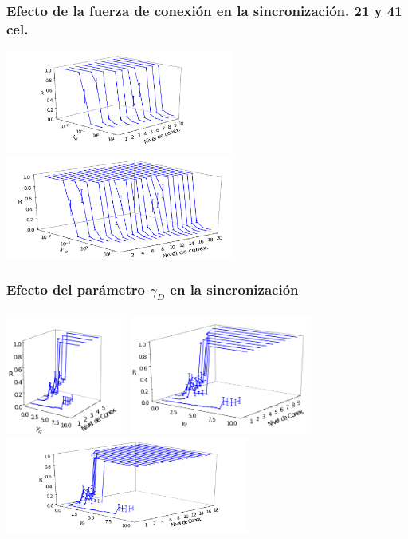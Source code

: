 \documentclass[xcolor=table, xllnames]{beamer}
\begin{document}
\begin{frame}
\frametitle{Efecto de la fuerza de conexión en la sincronización. 21 y 41 cel.}

\centering
\includegraphics[width=7.5cm]{Figuras/figuraVarkdcortadoVer3d_43.pdf} \\
\includegraphics[width=7.5cm]{Figuras/figuraVarkdcortadoVer3d_42.pdf}

\end{frame}

\begin{frame}
	\frametitle{Efecto del parámetro $\gamma_D$ en la sincronización}
	\centering
	\includegraphics[width=4.0cm]{Figuras/figuraVarGdSVer3d_26.pdf} 
	\includegraphics[width=6.0cm]{Figuras/figuraVarGdSVer3d_17.pdf} \\
	\includegraphics[width=8.0cm]{Figuras/figuraVarGdSVer3d_25.pdf}
\end{frame}
\end{document}
